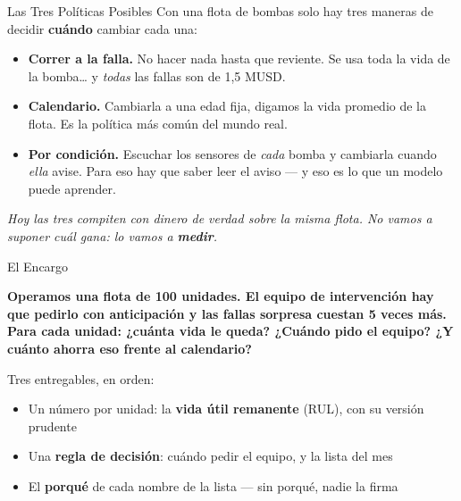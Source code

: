 \documentclass[aspectratio=169, 11pt]{beamer}
\begin{document}
\begin{frame}[shrink=8]{Las Tres Políticas Posibles}
  \vspace{2pt}
  {\footnotesize\color{textMuted}
  Con una flota de bombas solo hay tres maneras de decidir \textbf{cuándo}
  cambiar cada una:}
  \vspace{8pt}
  {\footnotesize
    \begin{itemize}\setlength{\itemsep}{10pt}
    \item[{\color{arcaDark}\faBomb}]
      \textbf{Correr a la falla.} No hacer nada hasta que reviente. Se usa
      toda la vida de la bomba\ldots{} y \emph{todas} las fallas son
      de 1,5 MUSD.
    \item[{\color{codeOrange}\faCalendar}]
      \textbf{Calendario.} Cambiarla a una edad fija, digamos la vida
      promedio de la flota. Es la política más común del mundo real.
    \item[{\color{arcaRed}\faHeartbeat}]
      \textbf{Por condición.} Escuchar los sensores de \emph{cada} bomba y
      cambiarla cuando \emph{ella} avise. Para eso hay que saber leer el
      aviso --- y eso es lo que un modelo puede aprender.
    \end{itemize}}
  \vspace{8pt}
  {\scriptsize\color{arcaDark}\itshape
   Hoy las tres compiten con dinero de verdad sobre la misma flota. No
   vamos a suponer cuál gana: lo vamos a \textbf{medir}.}
\end{frame}

\begin{frame}[shrink=14]{El Encargo}
  \vspace{2pt}
  \begin{tcolorbox}[colback=arcaGray, colframe=arcaRed, boxrule=0pt,
    leftrule=4pt, arc=3pt, left=10pt, right=10pt, top=8pt, bottom=8pt]
    {\normalsize\color{arcaDark}\bfseries
     Operamos una flota de 100 unidades. El equipo de intervención hay que
     pedirlo con anticipación y las fallas sorpresa cuestan 5 veces más.}\\[8pt]
    {\normalsize\color{arcaRed}\bfseries
     Para cada unidad: ¿cuánta vida le queda? ¿Cuándo pido el equipo?
     ¿Y cuánto ahorra eso frente al calendario?}
  \end{tcolorbox}
  \vspace{8pt}
  {\footnotesize\color{textMuted}
  Tres entregables, en orden:
  \begin{itemize}\setlength{\itemsep}{5pt}
    \item[{\color{arcaRed}\scriptsize 1.}]
      Un número por unidad: la \textbf{vida útil remanente} (RUL), con su
      versión prudente
    \item[{\color{arcaRed}\scriptsize 2.}]
      Una \textbf{regla de decisión}: cuándo pedir el equipo, y la lista
      del mes
    \item[{\color{arcaRed}\scriptsize 3.}]
      El \textbf{porqué} de cada nombre de la lista --- sin porqué, nadie
      la firma
  \end{itemize}}
\end{frame}
\end{document}
